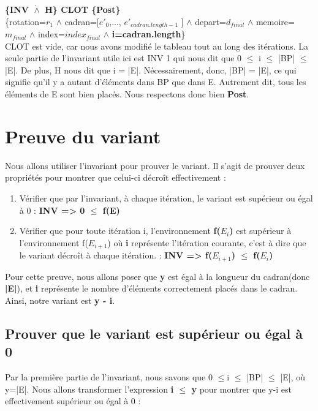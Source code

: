 \documentclass[a4paper, 12pt]{article}
\begin{document}
\textbf{\{INV $\dot{\wedge}$ H\} CLOT \{Post\}}\\

\{rotation=$r_{1}$ $\wedge$ cadran=[$e'_{0}$,..., $e'_{cadran.length-1}$ ] $\wedge$ depart=$d_{final}$ $\wedge$ memoire=$m_{final}$ $\wedge$ index=$index_{final}$ $\wedge$ \textbf{i=cadran.length}\}\\




CLOT est vide, car nous avons modifié le tableau tout au long des itérations.
La seule partie de l'invariant utile ici est INV 1 qui nous dit que 0 $\le$ i $\le$ |BP| $\le$ |E|. De plus, H nous dit que i = |E|. Nécessairement, donc, |BP| = |E|, ce qui signifie qu'il y a autant d'éléments dans BP que dans E. Autrement dit, tous les éléments de E sont bien placés.
Nous respectons donc bien \textbf{Post}.

\newpage
\section{Preuve du variant}
Nous allons utiliser l'invariant pour prouver le variant. Il s'agit de prouver deux propriétés pour montrer que celui-ci décroît effectivement : 
\begin{enumerate}


\item Vérifier que par l'invariant, à chaque itération, le variant est supérieur ou égal à 0 : \textbf{INV => 0 $\le$ f(E) }
\item Vérifier que pour toute itération i, l'environnement \textbf{f($E_{i}$)} est supérieur à l'environnement f($E_{i+1}$) où \textbf{i} représente l'itération courante, c'est à dire que le variant décroît à chaque itération. : \textbf{ INV => f($E_{i+1}$) $\le$ f($E_{i}$)}
\end{enumerate}

Pour cette preuve, nous allons poser que \textbf{y} est égal à la longueur du cadran(donc \textbf{|E|}), et \textbf{i} représente le nombre d'éléments correctement placés dans le cadran.\\

Ainsi, notre variant est \textbf{y - i}.
\subsection{Prouver que le variant est supérieur ou égal à 0}
Par la première partie de l'invariant, nous savons que 0 $\le$i $\le$ |BP| $\le$ |E|, où y=|E|. Nous allons transformer l'expression \textbf{i $\le$ y} pour montrer que y-i est effectivement supérieur ou égal à 0 : \\
\end{document}
